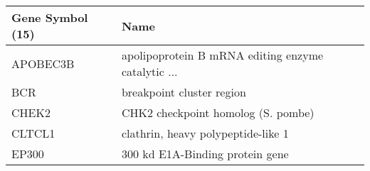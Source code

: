 \begin{tabular}{ll}
\toprule
Gene Symbol (15) &                                               Name \\
\midrule
        APOBEC3B & apolipoprotein B mRNA editing enzyme catalytic ... \\
             BCR &                          breakpoint cluster region \\
           CHEK2 &                 CHK2 checkpoint homolog (S. pombe) \\
          CLTCL1 &                 clathrin, heavy polypeptide-like 1 \\
           EP300 &                    300 kd E1A-Binding protein gene \\
\bottomrule
\end{tabular}
